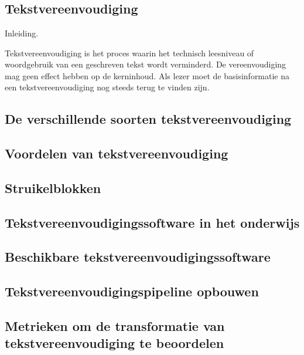 \chapter{}%
\label{ch:stand-van-zaken}

\section{Tekstvereenvoudiging}

Inleiding.

Tekstvereenvoudiging is het proces waarin het technisch leesniveau of woordgebruik van een geschreven tekst wordt verminderd. De vereenvoudiging mag geen effect hebben op de kerninhoud. Als lezer moet de basisinformatie na een tekstvereenvoudiging nog steeds terug te vinden zijn.

\section{De verschillende soorten tekstvereenvoudiging}

\section{Voordelen van tekstvereenvoudiging}

\section{Struikelblokken}

\section{Tekstvereenvoudigingssoftware in het onderwijs}

\section{Beschikbare tekstvereenvoudigingssoftware}

\section{Tekstvereenvoudigingspipeline opbouwen}

\section{Metrieken om de transformatie van tekstvereenvoudiging te beoordelen}

